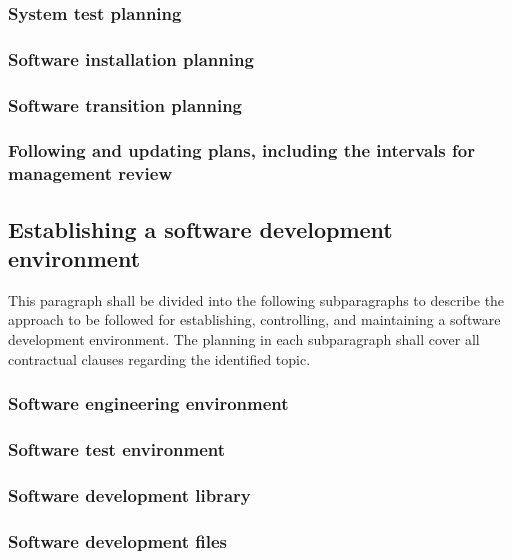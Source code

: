 \documentclass{fidata-report-template}
\begin{document}
\subsubsection{System test planning}

\subsubsection{Software installation planning}

\subsubsection{Software transition planning}

\subsubsection{Following and updating plans, including the intervals
for management review}

\subsection{Establishing a software development environment}

This paragraph shall be divided into the following subparagraphs to
describe the approach to be followed for establishing, controlling, and
maintaining a software development environment. The planning in each
subparagraph shall cover all contractual clauses regarding the
identified topic.

\subsubsection{Software engineering environment}

\subsubsection{Software test environment}

\subsubsection{Software development library}

\subsubsection{Software development files}
\end{document}
